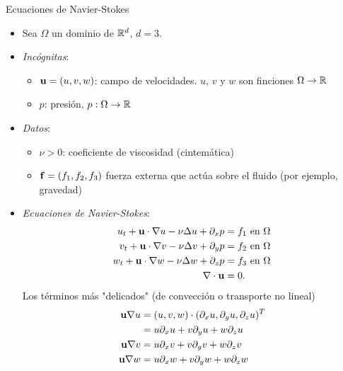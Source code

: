 \documentclass[8pt]{beamer}
\begin{document}
\begin{frame}{Ecuaciones de Navier-Stokes}
  \begin{itemize}
  \item Sea $\Omega$ un dominio de ${\mathbb R}^d$, $d=3$.
  \item \emph{Incógnitas}:
  \begin{itemize}
      \item $\mathbf{u}=(u,v,w)$: campo de velocidades. $u$, $v$ y $w$ son finciones $\Omega \to {\mathbb R}$
      \item $p$: presión, $p:\Omega \to {\mathbb R}$
  \end{itemize}
  \item \emph{Datos}:
  \begin{itemize}
    \item $\nu>0$: coeficiente de viscosidad (cintemática)
      \item $\mathbf{f}=(f_1,f_2,f_3)$ fuerza externa que actúa sobre el fluido (por ejemplo, gravedad)
  \end{itemize}
  \item \emph{Ecuaciones de Navier-Stokes}:
  \begin{align}
    u_t + \mathbf{u}\cdot\nabla u - \nu\Delta u + \partial_x p &= f_1 \text{ en } \Omega
    \\
    v_t + \mathbf{u}\cdot\nabla v - \nu\Delta v + \partial_y p &= f_2 \text{ en } \Omega
    \\
    w_t + \mathbf{u}\cdot\nabla w - \nu\Delta w + \partial_z p &= f_3 \text{ en } \Omega
    \\
    \nabla\cdot{}\mathbf{u} &= 0.
  \end{align}
  Los términos más "delicados" (de convección o transporte no lineal)
  \begin{align}
  \mathbf{u}\nabla u &= (u,v,w) \cdot (\partial_x u, \partial_y u, \partial_z u)^T \\
  &= u \partial_x u + v \partial_y u + w \partial_z u
  \\
  \mathbf{u}\nabla v &= u \partial_x v + v \partial_y v + w \partial_z v
  \\
  \mathbf{u}\nabla w &= u \partial_x w + v \partial_y w + w \partial_z w
\end{align}
  \end{itemize}
\end{frame}
\end{document}
